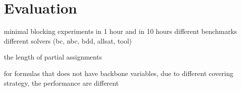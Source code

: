 \section{Evaluation} \label{sec:expr}
minimal blocking experiments
in 1 hour and in 10 hours
different benchmarks
different solvers (bc, nbc, bdd, allsat, tool)

the length of partial assignments 

for formulas that does not have backbone variables, due to different covering strategy, the performance are different

